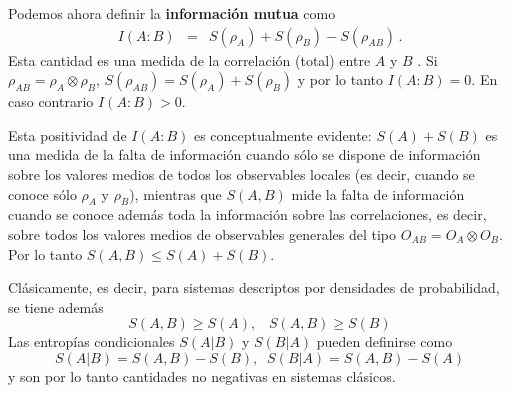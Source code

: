 

Podemos ahora definir la {\bf información mutua} como %
\begin{eqnarray}
I(A:B)&=&S(\rho_A)+S(\rho_B)-S(\rho_{AB})\,.\label{qmut1}%
\end{eqnarray}
Esta cantidad es una medida de la correlación (total) entre $A$ y $B$
\cite{NC.00,Wh}. Si $\rho_{AB}=\rho_A\otimes\rho_B$, %
$S(\rho_{AB})=S(\rho_A)+S(\rho_B)$ y por lo tanto $I(A:B)=0$. En caso contrario 
$I(A:B)>0$. 

Esta positividad de $I(A:B)$ es conceptualmente evidente: $S(A)+S(B)$ es una medida de la falta de
información cuando s\'olo se dispone de información sobre los valores medios de todos los observables locales (es decir, cuando se conoce s\'olo $\rho_A$ y $\rho_B$), 
 mientras que $S(A,B)$ mide la falta de información cuando se conoce además
toda la información sobre las correlaciones,
es decir, sobre todos los valores medios de observables generales del tipo $O_{AB}=O_A\otimes O_B$. Por lo tanto $S(A,B)\leq S(A)+S(B)$.

Clásicamente, es decir, para sistemas descriptos por densidades de probabilidad, se tiene además 
\begin{equation}
S(A,B)\geq S(A),\;\;\;S(A,B)\geq S(B)\label{desc}\end{equation}
Las entropías condicionales $S(A|B)$ y $S(B|A)$ pueden definirse como 
\begin{equation}S(A|B)=S(A,B)-S(B),\;\;S(B|A)=S(A,B)-S(A)\label{Scond}\end{equation}
y son por lo tanto cantidades no negativas en sistemas clásicos. 

